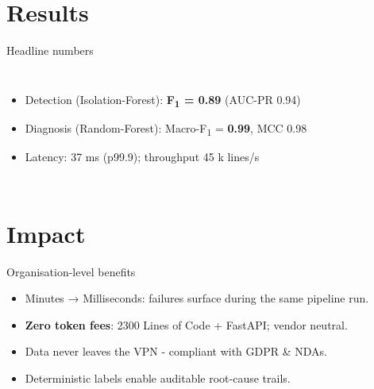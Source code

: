 \documentclass[14pt,aspectratio=169,draft]{beamer}
\newcommand{\IForest}{Isolation-Forest\xspace}
\newcommand{\RForest}{Random-Forest\xspace}
\newcommand{\LOC}{Lines of Code\xspace}
\begin{document}
\section{Results}
\begin{frame}{Headline numbers}
\begin{columns}
\small
\begin{itemize}[<+->]
  \item Detection (\IForest): \textbf{F\textsubscript{1} = 0.89}  (AUC-PR 0.94)
  \item Diagnosis (\RForest): Macro-F\textsubscript{1} = \textbf{0.99}, MCC 0.98
  \item Latency: 37 ms (p99.9); throughput 45 k lines/s
\end{itemize}

\centering
\begin{adjustbox}{max width=\linewidth}
\end{adjustbox}
\end{columns}
\end{frame}

\section{Impact}
\begin{frame}{Organisation-level benefits}
\begin{itemize}[<+->]
  \item \alert{Minutes → Milliseconds}: failures surface during the same pipeline run.
  \item \textbf{Zero token fees}: 2300 \LOC{} + FastAPI; vendor neutral.
  \item Data never leaves the VPN - compliant with GDPR \& NDAs.
  \item Deterministic labels enable auditable root-cause trails.
\end{itemize}
\end{frame}
\end{document}
